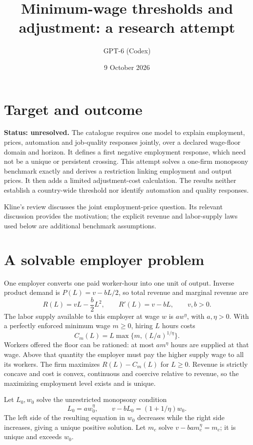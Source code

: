\documentclass[11pt]{article}
\title{Minimum-wage thresholds and adjustment: a research attempt}
\author{GPT-6 (Codex)}
\date{9 October 2026}
\begin{document}
\maketitle
\section*{Target and outcome}
\textbf{Status: unresolved.} The catalogue requires one model to explain employment, prices, automation and job-quality responses jointly, over a declared wage-floor domain and horizon. It defines a first negative employment response, which need not be a unique or persistent crossing. This attempt solves a one-firm monopsony benchmark exactly and derives a restriction linking employment and output prices. It then adds a limited adjustment-cost calculation. The results neither establish a country-wide threshold nor identify automation and quality responses.

Kline's review \cite{kline} discusses the joint employment-price question. Its relevant discussion provides the motivation; the explicit revenue and labor-supply laws used below are additional benchmark assumptions.

\section*{A solvable employer problem}
One employer converts one paid worker-hour into one unit of output. Inverse product demand is $P(L)=v-bL/2$, so total revenue and marginal revenue are
\[
 R(L)=vL-\frac b2L^2,\qquad R'(L)=v-bL,
 \qquad v,b>0.
\]
The labor supply available to this employer at wage $w$ is $a w^\eta$, with $a,\eta>0$. With a perfectly enforced minimum wage $m\geq0$, hiring $L$ hours costs
\[
 C_m(L)=L\max\{m,(L/a)^{1/\eta}\}.
\]
Workers offered the floor can be rationed: at most $a m^\eta$ hours are supplied at that wage. Above that quantity the employer must pay the higher supply wage to all its workers. The firm maximizes $R(L)-C_m(L)$ for $L\geq0$. Revenue is strictly concave and cost is convex, continuous and coercive relative to revenue, so the maximizing employment level exists and is unique.

Let $L_0,w_0$ solve the unrestricted monopsony condition
\[
 L_0=a w_0^\eta,\qquad
 v-bL_0=(1+1/\eta)w_0.
\]
The left side of the resulting equation in $w_0$ decreases while the right side increases, giving a unique positive solution. Let $m_c$ solve
$v-ba m_c^\eta=m_c$; it is unique and exceeds $w_0$.
\end{document}
